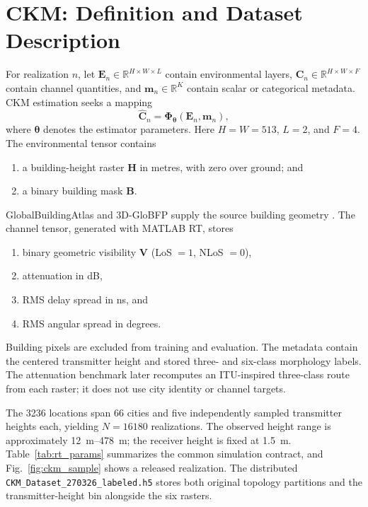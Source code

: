 \documentclass[10pt,conference,letterpaper]{IEEEtran}
\begin{document}
\section{CKM: Definition and Dataset Description}
\label{sec:ckm_dataset}

For realization $n$, let $\mathbf E_n\in\mathbb R^{H\times W\times L}$
contain environmental layers, $\mathbf C_n\in\mathbb R^{H\times W\times F}$
contain channel quantities, and $\mathbf m_n\in\mathbb R^K$ contain scalar or
categorical metadata. CKM estimation seeks a mapping
\begin{equation}
\widehat{\mathbf C}_n=\mathbf\Phi_{\boldsymbol\theta}
(\mathbf E_n,\mathbf m_n),
\label{eq:mapping_generic}
\end{equation}
where $\boldsymbol\theta$ denotes the estimator parameters. Here $H=W=513$,
$L=2$, and $F=4$. The environmental tensor contains
\begin{enumerate}
    \item a building-height raster $\mathbf H$ in metres, with zero over
    ground; and
    \item a binary building mask $\mathbf B$.
\end{enumerate}
GlobalBuildingAtlas and 3D-GloBFP supply the source building geometry
\cite{Che2024globfp,Zhu2025atlas}. The channel tensor, generated with MATLAB
RT, stores
\begin{enumerate}
    \item binary geometric visibility $\mathbf V$ (LoS $=1$, NLoS $=0$),
    \item attenuation in dB,
    \item RMS delay spread in ns, and
    \item RMS angular spread in degrees.
\end{enumerate}
Building pixels are excluded from training and evaluation. The metadata contain
the centered transmitter height and stored three- and six-class morphology
labels. The attenuation benchmark later recomputes an ITU-inspired three-class
route from each raster; it does not use city identity or channel targets.

The 3236 locations span 66 cities and five independently sampled transmitter
heights each, yielding $N=16180$ realizations. The observed height range is
approximately \SIrange{12}{478}{m}; the receiver height is fixed at
\SI{1.5}{m}. Table~\ref{tab:rt_params} summarizes the common simulation
contract, and Fig.~\ref{fig:ckm_sample} shows a released realization. The
distributed \nolinkurl{CKM_Dataset_270326_labeled.h5} stores both original
topology partitions and the transmitter-height bin alongside the six rasters.
\end{document}

